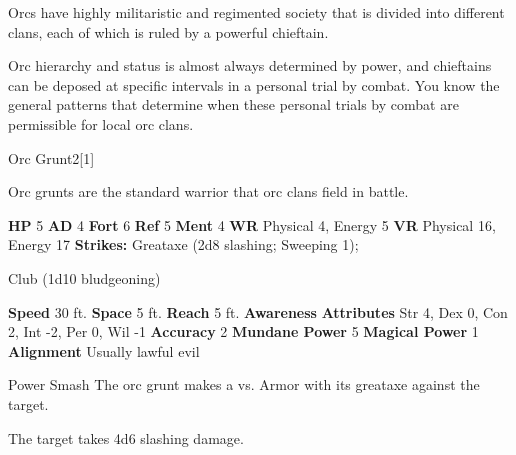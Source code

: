       Orcs have highly militaristic and regimented society that is divided into different clans, each of which is ruled by a powerful chieftain.
    
      Orc hierarchy and status is almost always determined by power, and chieftains can be deposed at specific intervals in a personal trial by combat.
      You know the general patterns that determine when these personal trials by combat are permissible for local orc clans.
    

      
  \begin{monsubsection}{Orc Grunt}{2}[1]
    \vspace{-1em}\vspace{-1em}
    \vspace{0em}

    
          Orc grunts are the standard warrior that orc clans field in battle.
        

    \begin{spellcontent}
      \begin{spelltargetinginfo}
        \pari \textbf{HP} 5 \monsep
          \textbf{AD} 4 \monsep
          \textbf{Fort} 6 \monsep
          \textbf{Ref} 5 \monsep
          \textbf{Ment} 4
        \pari \textbf{WR} Physical 4, Energy 5 \monsep
        \textbf{VR} Physical 16, Energy 17
        \pari \textbf{Strikes:}
            Greataxe  (2d8 slashing; Sweeping 1);
\par Club  (1d10 bludgeoning)
      \end{spelltargetinginfo}
    \end{spellcontent}
    \begin{monsterfooter}
      \pari \textbf{Speed} 30 ft. \monsep
        \textbf{Space} 5 ft. \monsep
        \textbf{Reach} 5 ft.
      \pari \textbf{Awareness} 
      \pari \textbf{Attributes}
        Str 4, Dex 0,
        Con 2, Int -2,
        Per 0, Wil -1
      \pari \textbf{Accuracy} 2 \monsep
        \textbf{Mundane Power} 5 \monsep
      \textbf{Magical Power} 1
      \pari \textbf{Alignment} Usually lawful evil
    \end{monsterfooter}
  \end{monsubsection}
  \begin{freeability}{Power Smash}
       The orc grunt makes a 
         vs. Armor
        with its greataxe against the target.
    
    \hit The target takes 4d6 slashing damage.
    \end{freeability}
  

